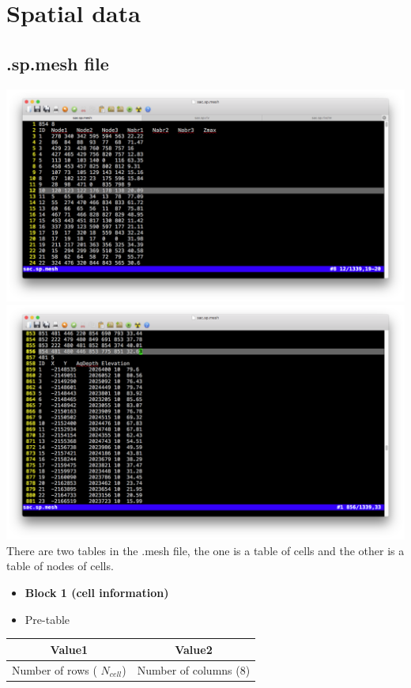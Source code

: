 \documentclass[
]{scrbook}
\begin{document}
\hypertarget{spatial-data}{%
\section{Spatial data}\label{spatial-data}}

\hypertarget{sp.mesh-file}{%
\subsection{.sp.mesh file}\label{sp.mesh-file}}

\includegraphics{Fig/IO/sp.mesh1.png}
\includegraphics{Fig/IO/sp.mesh2.png}
There are two tables in the .mesh file, the one is a table of cells and the other is a table of nodes of cells.

\begin{itemize}
\item
  \textbf{Block 1 (cell information)}
\item
  Pre-table
\end{itemize}

\begin{longtable}[]{@{}cc@{}}
\toprule
Value1 & Value2\tabularnewline
\midrule
\endhead
Number of rows ( \(N_{cell}\)) & Number of columns (\(8\))\tabularnewline
\bottomrule
\end{longtable}
\end{document}

